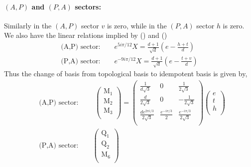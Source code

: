 \documentclass[12pt,a4paper]{article}
\begin{document}
\paragraph{$(A,P)$ and $(P,A)$ sectors:}
Similarly in the $(A,P)$ sector $v$ is zero, while in the $(P,A)$ sector $h$ is zero. 
We also have the linear relations implied by () and ()
\begin{align}
\text{(A,P) sector:} \quad \quad e^{5i\pi /12} X = \frac{d+1}{\sqrt{d}}(e -\frac{h + t}{d})\\
\text{(P,A) sector:} \quad \quad e^{-9i\pi /12} X = \frac{d+1}{\sqrt{d}}(e -\frac{t + v}{d})
\end{align}
Thus the change of basis from topological basis to idempotent basis is given by,
\begin{align}
&\text{(A,P) sector: } \quad \quad \left( \begin{matrix}
\text{M}_1\\
\text{M}_2\\
\text{M}_3\\
\end{matrix} \right)
= \left( \begin{matrix}
\frac{1}{d\sqrt{3}} & 0 & \frac{1}{2 \sqrt{3}} \\
\frac{d}{2 \sqrt{3}} & 0 & - \frac{1}{2 \sqrt{3}} \\
\frac{d e^{2 \pi i/3}}{2 \sqrt{3}} & \frac{e^{- i \pi /3}}{2} & \frac{e^{- i \pi /3}}{2 \sqrt{3}}\\
\end{matrix} \right)
\left( \begin{matrix}
e\\
t\\
h\\
\end{matrix} \right) \\
&\text{(P,A) sector:} \quad \quad  \left( \begin{matrix}
\text{Q}_1\\
\text{Q}_2\\
\text{M}_6\\
\end{matrix} \right)

\end{align}
\end{document}
